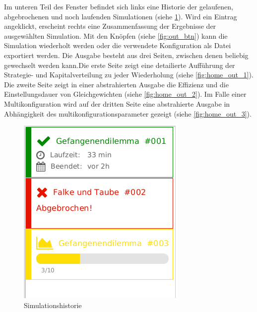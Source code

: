 \documentclass[parskip=full,11pt]{scrartcl}
\begin{document}
\newpage
Im unteren Teil des Fenster befindet sich links eine Historie der gelaufenen, abgebrochenen und noch laufenden Simulationen (siehe \cref{fig:history}). Wird ein Eintrag angeklickt, erscheint rechts eine Zusammenfassung der Ergebnisse der ausgewählten Simulation. Mit den Knöpfen (siehe \cref{fig:out_btn}) kann die Simulation wiederholt werden oder die verwendete Konfiguration als Datei exportiert werden. Die Ausgabe besteht aus drei Seiten, zwischen denen beliebig gewechselt werden kann.Die erste Seite zeigt eine detailierte Aufführung der Strategie- und Kapitalverteilung zu jeder Wiederholung (siehe \cref{fig:home_out_1}). Die zweite Seite zeigt in einer abstrahierten Ausgabe die Effizienz und die Einstellungsdauer von Gleichgewichten (siehe \cref{fig:home_out_2}). Im Falle einer Multikonfiguration wird auf der dritten Seite eine abstrahierte Ausgabe in Abhängigkeit des multikonfigurationsparameter gezeigt (siehe \cref{fig:home_out_3}).



\begin{figure}[hb]
	\centering
	\includegraphics[height=0.5\linewidth ]{images/history.png}
	\caption{\label{fig:history}
		Simulationshistorie }
\end{figure}
\end{document}
